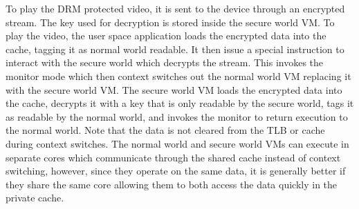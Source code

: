     To play the DRM protected video, it is sent to the device through an 
    encrypted stream. The key used for decryption is stored inside the secure 
    world VM. To play the video, the user space application loads the encrypted 
    data into the cache, tagging it as normal world readable. It then issue a 
    special instruction to interact with the secure world which decrypts the 
    stream. This invokes the monitor mode which then context switches out the 
    normal world VM replacing it with the secure world VM. The secure world VM 
    loads the encrypted data into the cache, decrypts it with a key that is 
    only readable by the secure world, tags it as readable by the normal world, 
    and invokes the monitor to return execution to the normal world. Note that 
    the data is not cleared from the TLB or cache during context switches. 
    The normal world and secure world VMs can execute in separate cores which 
    communicate through the shared cache instead of context switching, however, 
    since they operate on the same data, it is generally better if they share 
    the same core allowing them to both access the data quickly in the private 
    cache.
